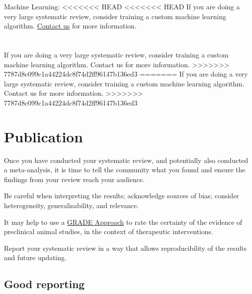 \documentclass[
]{book}
\begin{document}
Machine Learning:
\textless\textless\textless\textless\textless\textless\textless{} HEAD
\textless\textless\textless\textless\textless\textless\textless{} HEAD
If you are doing a very large systematic review, consider training a custom machine learning algorithm. \href{mailto:camarades.berlin@charite.de}{Contact us} for more information.

\hypertarget{section}{%
\chapter{\texorpdfstring{}{ }}\label{section}}

If you are doing a very large systematic review, consider training a custom machine learning algorithm. Contact us for more information.
\textgreater\textgreater\textgreater\textgreater\textgreater\textgreater\textgreater{} 7787d8c099c1a44224dc8f74d2ff96147b136ed3
=======
If you are doing a very large systematic review, consider training a custom machine learning algorithm. Contact us for more information.
\textgreater\textgreater\textgreater\textgreater\textgreater\textgreater\textgreater{} 7787d8c099c1a44224dc8f74d2ff96147b136ed3

\hypertarget{publication}{%
\chapter{Publication}\label{publication}}

Once you have conducted your systematic review, and potentially also conducted a meta-analysis, it is time to tell the community what you found and ensure the findings from your review reach your audience.

Be careful when interpreting the results; acknowledge sources of bias; consider heterogeneity, generalisability, and relevance.

It may help to use a \href{https://journals.plos.org/plosone/article?id=10.1371/journal.pone.0187271}{GRADE Approach} to rate the certainty of the evidence of preclinical animal studies, in the context of therapeutic interventions.

Report your systematic review in a way that allows reproducibility of the results and future updating.

\hypertarget{good-reporting}{%
\section{Good reporting}\label{good-reporting}}
\end{document}
